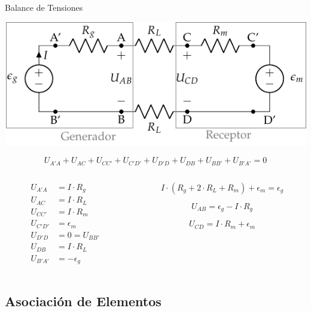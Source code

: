\documentclass[xcolor={usenames,svgnames,dvipsnames}]{beamer}
\begin{document}
\begin{frame}[label={sec:org610792f}]{Balance de Tensiones}
\begin{center}
\includegraphics[height=0.3\textheight]{figs/circuito_lkv.pdf}
\end{center}
\begin{equation*}
  U_{A'A} + U_{AC} + U_{CC'} + U_{C'D'} + U_{D'D} + U_{DB} + U_{BB'} + U_{B'A'} = 0
\end{equation*}

\begin{columns}
\begin{column}{0.3\columnwidth}
\begin{align*}
  U_{A'A} &= I \cdot R_g\\
  U_{AC} &= I \cdot R_L\\
  U_{CC'} &= I \cdot R_m\\
  U_{C'D'} &= \epsilon_m\\
  U_{D'D} &= 0 = U_{BB'}\\
  U_{DB} &= I \cdot R_L\\
  U_{B'A'} &= -\epsilon_g
\end{align*}
\end{column}
\begin{column}{0.7\columnwidth}
\begin{equation*}
  I \cdot (R_g + 2\cdot R_L + R_m) + \epsilon_m = \epsilon_g
\end{equation*}

\begin{equation*}
  U_{AB} = \epsilon_g - I \cdot R_g
\end{equation*}

\begin{equation*}
  U_{CD} = I\cdot R_m + \epsilon_m
\end{equation*}
\end{column}
\end{columns}
\end{frame}
\subsection{Asociación de Elementos}
\label{sec:org6cfe02e}
\end{document}
